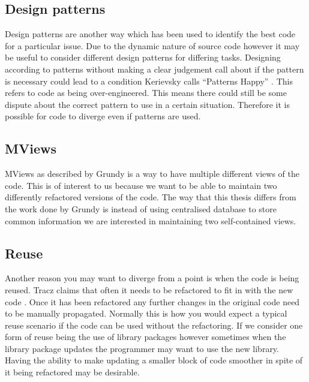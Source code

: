 \documentclass[12pt]{CRPITStyle}
\renewcommand{\cite}{\citep}
\begin{document}
\subsection{Design patterns}
Design patterns are another way which has been used to identify the best code for a particular issue. Due to the dynamic nature of source code however it may be useful to consider different design patterns for differing tasks. Designing according to patterns without making a clear judgement call about if the pattern is necessary could lead to a condition Kerievsky calls ``Patterns Happy'' \cite{Kerievsky2004}. This refers to code as being over-engineered. This means there could still be some dispute about the correct pattern to use in a certain situation. Therefore it is possible for code to diverge even if patterns are used.
\subsection{MViews}
MViews as described by Grundy is a way to have multiple different views of the code\cite{Grundy1993}. This is of interest to us because we want to be able to maintain two differently refactored versions of the code. The way that this thesis differs from the work done by Grundy is instead of using centralised database to store common information we are interested in maintaining two self-contained views.
\subsection{Reuse}
Another reason you may want to diverge from a point is when the code is being reused. Tracz claims that often it needs to be refactored to fit in with the new code \cite{Tracz1995}. Once it has been refactored any further changes in the original code need to be manually propagated. Normally this is how you would expect a typical reuse scenario if the code can be used without the refactoring. If we consider one form of reuse being the use of library packages however sometimes when the library package updates the programmer may want to use the new library. Having the ability to make updating a smaller block of code smoother in spite of it being refactored may be desirable. 
\end{document}
